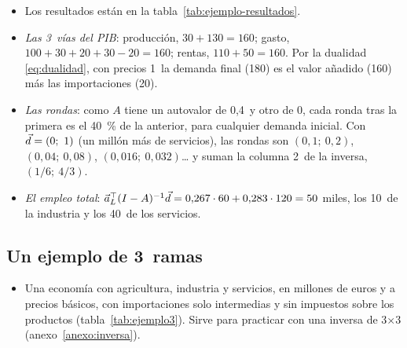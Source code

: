 \documentclass[11pt]{article}
\begin{document}
\begin{itemize}
\item Los resultados están en la tabla~\ref{tab:ejemplo-resultados}.
\item \emph{Las 3~vías del PIB}: producción, $30+130=160$; gasto, $100+30+20+30-20=160$; rentas, $110+50=160$. Por la dualidad \eqref{eq:dualidad}, con precios 1~la demanda final (180) es el valor añadido (160) más las importaciones (20).
\item \emph{Las rondas}: como $A$ tiene un autovalor de 0,4~y otro de 0, cada ronda tras la primera es el 40~\% de la anterior, para cualquier demanda inicial. Con $\vec{d}=(0;\ 1)$ (un millón más de servicios), las rondas son $(0{,}1;\ 0{,}2)$, $(0{,}04;\ 0{,}08)$, $(0{,}016;\ 0{,}032)$… y suman la columna 2~de la inversa, $(1/6;\ 4/3)$.
\item \emph{El empleo total}: $\vec{a}_L^{\top}(I-A)^{-1}\vec{d}=0{,}267\cdot60+0{,}283\cdot120=50$ miles, los 10~de la industria y los 40~de los servicios.
\end{itemize}

\subsection{Un ejemplo de 3~ramas}\label{anexo:ejemplo-3}

\begin{itemize}
\item Una economía con agricultura, industria y servicios, en millones de euros y a precios básicos, con importaciones solo intermedias y sin impuestos sobre los productos (tabla~\ref{tab:ejemplo3}). Sirve para practicar con una inversa de 3×3 (anexo~\ref{anexo:inversa}).
\end{itemize}
\end{document}
